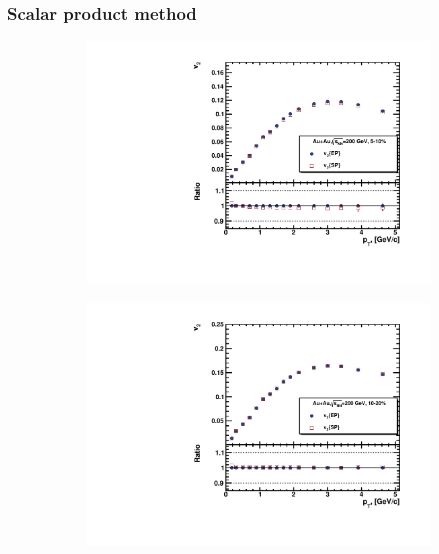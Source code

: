 \FloatBarrier
\subsubsection{Scalar product method}

\begin{figure}[ht]
    \begin{subfigure}{.49\textwidth}
        \centering
        \includegraphics[width=1.\linewidth]{Figures/v2_CH_SP_pt_cent1.pdf}
    \end{subfigure}
    \begin{subfigure}{.49\textwidth}
        \centering
        \includegraphics[width=1.\linewidth]{Figures/v2_CH_SP_pt_cent2.pdf}
    \end{subfigure}
    \\

\end{figure}
